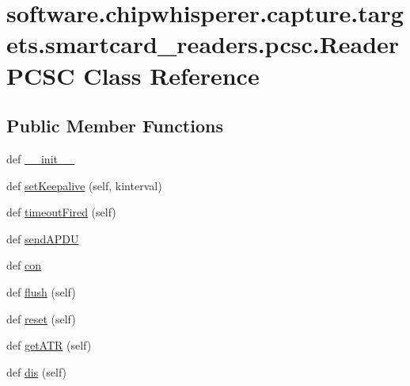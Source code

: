 \hypertarget{classsoftware_1_1chipwhisperer_1_1capture_1_1targets_1_1smartcard__readers_1_1pcsc_1_1ReaderPCSC}{}\section{software.\+chipwhisperer.\+capture.\+targets.\+smartcard\+\_\+readers.\+pcsc.\+Reader\+P\+C\+S\+C Class Reference}
\label{classsoftware_1_1chipwhisperer_1_1capture_1_1targets_1_1smartcard__readers_1_1pcsc_1_1ReaderPCSC}
\subsection*{Public Member Functions}
\begin{DoxyCompactItemize}
\item 
def \hyperlink{classsoftware_1_1chipwhisperer_1_1capture_1_1targets_1_1smartcard__readers_1_1pcsc_1_1ReaderPCSC_a4922fea0512705c7b1b77d29f7185059}{\+\_\+\+\_\+init\+\_\+\+\_\+}
\item 
def \hyperlink{classsoftware_1_1chipwhisperer_1_1capture_1_1targets_1_1smartcard__readers_1_1pcsc_1_1ReaderPCSC_af1af8aea99375294c7d634c171bde770}{set\+Keepalive} (self, kinterval)
\item 
def \hyperlink{classsoftware_1_1chipwhisperer_1_1capture_1_1targets_1_1smartcard__readers_1_1pcsc_1_1ReaderPCSC_aeffc2064c020736fb87aaf06e925d3dd}{timeout\+Fired} (self)
\item 
def \hyperlink{classsoftware_1_1chipwhisperer_1_1capture_1_1targets_1_1smartcard__readers_1_1pcsc_1_1ReaderPCSC_a327d91ae2150828330854cab516d6614}{send\+A\+P\+D\+U}
\item 
def \hyperlink{classsoftware_1_1chipwhisperer_1_1capture_1_1targets_1_1smartcard__readers_1_1pcsc_1_1ReaderPCSC_a302e42f8a262c1c673a1a4dbf9d76649}{con}
\item 
def \hyperlink{classsoftware_1_1chipwhisperer_1_1capture_1_1targets_1_1smartcard__readers_1_1pcsc_1_1ReaderPCSC_a1d0e224b3de98d8f3ba90ffaf080ff2f}{flush} (self)
\item 
def \hyperlink{classsoftware_1_1chipwhisperer_1_1capture_1_1targets_1_1smartcard__readers_1_1pcsc_1_1ReaderPCSC_a9b7489f0feee741290a63f9a913aa003}{reset} (self)
\item 
def \hyperlink{classsoftware_1_1chipwhisperer_1_1capture_1_1targets_1_1smartcard__readers_1_1pcsc_1_1ReaderPCSC_a9d25a866f966afef0a3afa82f4e4feb9}{get\+A\+T\+R} (self)
\item 
def \hyperlink{classsoftware_1_1chipwhisperer_1_1capture_1_1targets_1_1smartcard__readers_1_1pcsc_1_1ReaderPCSC_aec1e285715e1b745a76d8af3fea7f3d7}{dis} (self)
\end{DoxyCompactItemize}
